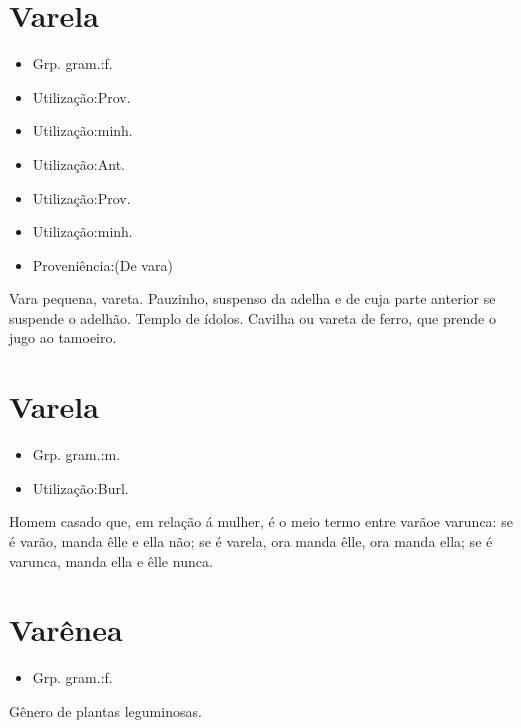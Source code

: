 \documentclass{article}
\begin{document}
\section{Varela}
\begin{itemize}
\item {Grp. gram.:f.}
\end{itemize}
\begin{itemize}
\item {Utilização:Prov.}
\end{itemize}
\begin{itemize}
\item {Utilização:minh.}
\end{itemize}
\begin{itemize}
\item {Utilização:Ant.}
\end{itemize}
\begin{itemize}
\item {Utilização:Prov.}
\end{itemize}
\begin{itemize}
\item {Utilização:minh.}
\end{itemize}
\begin{itemize}
\item {Proveniência:(De \textunderscore vara\textunderscore )}
\end{itemize}
Vara pequena, vareta.
Pauzinho, suspenso da adelha e de cuja parte anterior se suspende o adelhão.
Templo de ídolos.
Cavilha ou vareta de ferro, que prende o jugo ao tamoeiro.
\section{Varela}
\begin{itemize}
\item {Grp. gram.:m.}
\end{itemize}
\begin{itemize}
\item {Utilização:Burl.}
\end{itemize}
Homem casado que, em relação á mulher, é o meio termo entre \textunderscore varão\textunderscore  e \textunderscore varunca\textunderscore : \textunderscore se é varão, manda êlle e ella não; se é varela, ora manda êlle, ora manda ella; se é varunca, manda ella e êlle nunca\textunderscore .
\section{Varênea}
\begin{itemize}
\item {Grp. gram.:f.}
\end{itemize}
Gênero de plantas leguminosas.
\end{document}
